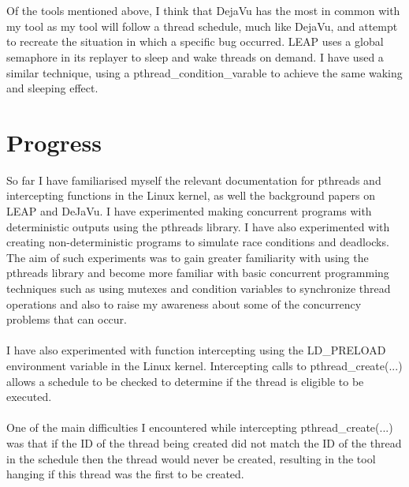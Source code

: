 \documentclass[a4paper,11pt]{article}
\begin{document}
\\
\\
Of the tools mentioned above, I think that DejaVu has the most in common with my tool as my tool will follow a thread schedule, much like DejaVu, and attempt to recreate the situation in which a specific bug occurred. LEAP uses a global semaphore in its replayer to sleep and wake threads on demand. I have used a similar technique, using a pthread\_condition\_varable to achieve the same waking and sleeping effect.

\section{Progress}
So far I have familiarised myself the relevant documentation for pthreads and intercepting functions in the Linux kernel, as well the background papers on LEAP and DeJaVu. I have experimented making concurrent programs with deterministic outputs using the pthreads library. I have also experimented with creating non-deterministic programs to simulate race conditions and deadlocks. The aim of such experiments was to gain greater familiarity with using the pthreads library and become more familiar with basic concurrent programming techniques such as using mutexes and condition variables to synchronize thread operations and also to raise my awareness about some of the concurrency problems that can occur.
\\
\\
I have also experimented with function intercepting using the LD\_PRELOAD environment variable in the Linux kernel. Intercepting calls to pthread\_create(...) allows a schedule to be checked to determine if the thread is eligible to be executed. 
\\
\\
One of the main difficulties I encountered while intercepting pthread\_create(...) was that if the ID of the thread being created did not match the ID of the thread in the schedule then the thread would never be created, resulting in the tool hanging if this thread was the first to be created.
\\
\\
\end{document}
